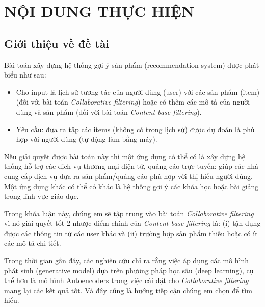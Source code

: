 \documentclass{article}[14pt]
\begin{document}
    \section{NỘI DUNG THỰC HIỆN}
    {

    
    \subsection{Giới thiệu về đề tài}
    
    
      Bài toán xây dựng hệ thống gợi ý sản phẩm (recommendation system) được phát biểu như sau:
      \begin{itemize}
          \item Cho input là lịch sử tương tác của người dùng (user)  với 
          các sản phẩm (item) (đối với bài toán \textit{Collaborative filtering}) 
          hoặc có thêm các mô tả của người dùng và sản phẩm 
          (đối với bài toán \textit{Content-base filtering}).
          \item Yêu cầu: đưa ra tập các items (không có trong lịch sử) 
          được dự đoán là phù hợp với người dùng (tự động làm bằng máy).
      \end{itemize}
      Nếu giải quyết được bài toán này thì một ứng dụng có thể có là xây dựng 
      hệ thống hỗ trợ các dịch vụ thương mại điện tử, quảng cáo trực tuyến: 
      giúp các nhà cung cấp dịch vụ đưa ra sản phẩm/quảng cáo phù hợp với 
      thị hiếu người dùng. Một ứng dụng khác có thể có khác là hệ thống gợi ý các 
      khóa học hoặc bài giảng trong lĩnh vực giáo dục.

      Trong khóa luận này, chúng em sẽ tập trung vào bài toán 
      \textit{Collaborative filtering} vì nó giải quyết tốt 2 nhược điểm chính 
      của \textit{Content-base filtering} là: 
      (i) tận dụng được các thông tin từ các user khác và 
      (ii) trường hợp sản phẩm thiếu hoặc có ít các mô tả chi tiết.
      
      Trong thời gian gần đây, các nghiên cứu chỉ ra rằng việc áp dụng các 
      mô hình phát sinh (generative model) dựa trên phương pháp học sâu 
      (deep learning), cụ thể hơn là mô hình Autoencoders trong việc cài đặt cho 
      \textit{Collaborative filtering} mang lại các kết quả tốt. 
      Và đây cũng là hướng tiếp cận chúng em chọn để tìm hiểu.

}
\end{document}
